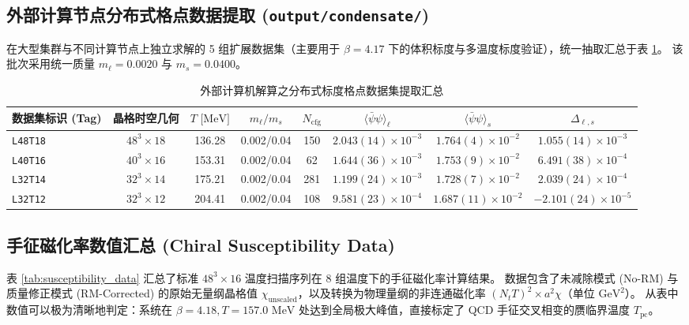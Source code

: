 \documentclass[11pt,a4paper]{ctexart}
\begin{document}
\subsection{\texorpdfstring{外部计算节点分布式格点数据提取 (\texttt{output/condensate/})}{外部计算节点分布式格点数据提取 (output/condensate/)}}

在大型集群与不同计算节点上独立求解的 5 组扩展数据集（主要用于 $\beta=4.17$ 下的体积标度与多温度标度验证），统一抽取汇总于表 \ref{tab:distributed_ensembles}。
该批次采用统一质量 $m_\ell = 0.0020$ 与 $m_s = 0.0400$。

\begin{table}[H]
\centering
\footnotesize
\setlength{\tabcolsep}{4pt}
\caption{外部计算机解算之分布式标度格点数据集提取汇总}
\label{tab:distributed_ensembles}
\begin{tabular}{lccccccc}
\toprule
数据集标识 (Tag) & 晶格时空几何 & $T\text{ [MeV]}$ & $m_\ell / m_s$ & $N_{\text{cfg}}$ & $\langle\bar{\psi}\psi\rangle_\ell$ & $\langle\bar{\psi}\psi\rangle_s$ & $\Delta_{\ell, s}$ \\
\midrule
\texttt{L48T18} & $48^3 \times 18$ & 136.28 & 0.002/0.04 & 150 & $2.043(14) \times 10^{-3}$ & $1.764(4) \times 10^{-2}$ & $1.055(14) \times 10^{-3}$ \\
\texttt{L40T16} & $40^3 \times 16$ & 153.31 & 0.002/0.04 & 62  & $1.644(36) \times 10^{-3}$ & $1.753(9) \times 10^{-2}$ & $6.491(38) \times 10^{-4}$ \\
\texttt{L32T14} & $32^3 \times 14$ & 175.21 & 0.002/0.04 & 281 & $1.199(24) \times 10^{-3}$ & $1.728(7) \times 10^{-2}$ & $2.039(24) \times 10^{-4}$ \\
\texttt{L32T12} & $32^3 \times 12$ & 204.41 & 0.002/0.04 & 108 & $9.581(23) \times 10^{-4}$ & $1.687(11) \times 10^{-2}$ & $-2.101(24) \times 10^{-5}$ \\
\bottomrule
\end{tabular}
\end{table}

\subsection{\texorpdfstring{手征磁化率数值汇总 (Chiral Susceptibility Data)}{手征磁化率数值汇总}}

表 \ref{tab:susceptibility_data} 汇总了标准 $48^3 \times 16$ 温度扫描序列在 8 组温度下的手征磁化率计算结果。
数据包含了未减除模式 (No-RM) 与质量修正模式 (RM-Corrected) 的原始无量纲晶格值 $\chi_{\text{unscaled}}$，以及转换为物理量纲的非连通磁化率 $(N_t T)^2 \times a^2\chi$（单位 $\text{GeV}^2$）。
从表中数值可以极为清晰地判定：系统在 $\beta=4.18, T=157.0\text{ MeV}$ 处达到全局极大峰值，直接标定了 QCD 手征交叉相变的赝临界温度 $T_{\text{pc}}$。
\end{document}
